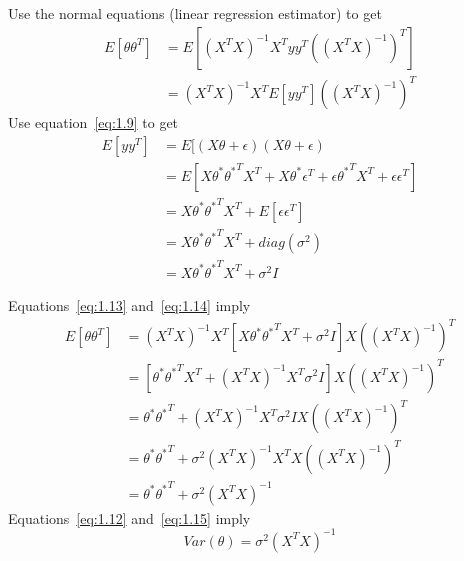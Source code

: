 \documentclass{article}
\begin{document}
Use the normal equations (linear regression estimator) to get
\begin{equation}
  \label{eq:1.13}
  \begin{split}
    E[\theta\theta^T] &= E\left[ (X^TX)^{-1} X^T yy^T \left( (X^TX)^{-1} \right)^T \right] \\    
    &= (X^TX)^{-1} X^T E[yy^T] \left( (X^TX)^{-1} \right)^T
  \end{split}
\end{equation}
Use equation~\ref{eq:1.9} to get 
\begin{equation}
  \label{eq:1.14}
  \begin{split}
    E[yy^T] &= E[(X\theta + \epsilon) (X\theta + \epsilon) \\
    &= E[X\theta^* {\theta^*}^T X^T + X\theta^*\epsilon^T + \epsilon {\theta^*}^T X^T + \epsilon\epsilon^T] \\
    &= X\theta^* {\theta^*}^T X^T + E[\epsilon\epsilon^T] \\
    &= X\theta^* {\theta^*}^T X^T + diag(\sigma^2) \\
    &= X\theta^* {\theta^*}^T X^T + \sigma^2 I
  \end{split}
\end{equation}

Equations~\ref{eq:1.13} and~\ref{eq:1.14} imply
\begin{equation}
  \label{eq:1.15}
  \begin{split}
    E[\theta\theta^T] &= (X^TX)^{-1} X^T \left[X\theta^* {\theta^*}^T X^T + \sigma^2 I \right] X\left( (X^TX)^{-1} \right)^T \\
    &= \left[\theta^* {\theta^*}^T X^T + (X^TX)^{-1} X^T \sigma^2 I \right] X \left( (X^TX)^{-1} \right)^T \\ 
    &= \theta^* {\theta^*}^T + (X^TX)^{-1} X^T \sigma^2 I X \left( (X^TX)^{-1} \right)^T \\
    &= \theta^* {\theta^*}^T + \sigma^2 (X^TX)^{-1} X^T X \left( (X^TX)^{-1} \right)^T \\
    &= \theta^* {\theta^*}^T + \sigma^2 (X^TX)^{-1}
  \end{split}
\end{equation}
Equations~\ref{eq:1.12} and~\ref{eq:1.15} imply
\begin{equation}
  \label{eq:1.16}
  Var(\theta) = \sigma^2 (X^TX)^{-1}
\end{equation}
\end{document}
